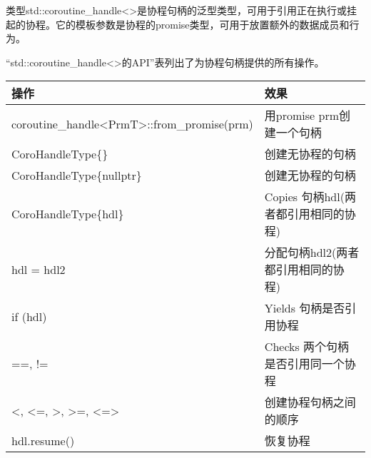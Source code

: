 
类型std::coroutine\_handle<>是协程句柄的泛型类型，可用于引用正在执行或挂起的协程。它的模板参数是协程的promise类型，可用于放置额外的数据成员和行为。

“std::coroutine\_handle<>的API”表列出了为协程句柄提供的所有操作。

\begin{longtable}[c]{|l|l|}
\hline
\textbf{操作}                                                                     & \textbf{效果}                                                                        \\ \hline
\endfirsthead
%
\endhead
%
coroutine\_handle\textless{}PrmT\textgreater{}::from\_promise(prm)                     & 用promise prm创建一个句柄                                                  \\ \hline
CoroHandleType\{\}                                                                     & 创建无协程的句柄                                                       \\ \hline
CoroHandleType\{nullptr\}                                                              & 创建无协程的句柄                                                      \\ \hline
CoroHandleType\{hdl\}                                                                  & Copies 句柄hdl(两者都引用相同的协程)                               \\ \hline
hdl = hdl2                                                                             & 分配句柄hdl2(两者都引用相同的协程)                             \\ \hline
if (hdl)                                                                               & Yields 句柄是否引用协程                                    \\ \hline
==, !=                                                                                 & Checks 两个句柄是否引用同一个协程                                 \\ \hline
\textless{}, \textless{}=, \textgreater{}, \textgreater{}=, \textless{}=\textgreater{} & 创建协程句柄之间的顺序                                             \\ \hline
hdl.resume()                                                                           & 恢复协程                                                                 \\ \hline

\end{longtable}
